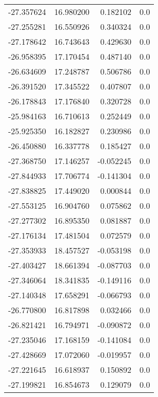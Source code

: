 \begin{tabular}{rrrr}
      -27.357624 &        16.980200 &    0.182102 &   0.0 \\
      -27.255281 &        16.550926 &    0.340324 &   0.0 \\
      -27.178642 &        16.743643 &    0.429630 &   0.0 \\
      -26.958395 &        17.170454 &    0.487140 &   0.0 \\
      -26.634609 &        17.248787 &    0.506786 &   0.0 \\
      -26.391520 &        17.345522 &    0.407807 &   0.0 \\
      -26.178843 &        17.176840 &    0.320728 &   0.0 \\
      -25.984163 &        16.710613 &    0.252449 &   0.0 \\
      -25.925350 &        16.182827 &    0.230986 &   0.0 \\
      -26.450880 &        16.337778 &    0.185427 &   0.0 \\
      -27.368750 &        17.146257 &   -0.052245 &   0.0 \\
      -27.844933 &        17.706774 &   -0.141304 &   0.0 \\
      -27.838825 &        17.449020 &    0.000844 &   0.0 \\
      -27.553125 &        16.904760 &    0.075862 &   0.0 \\
      -27.277302 &        16.895350 &    0.081887 &   0.0 \\
      -27.176134 &        17.481504 &    0.072579 &   0.0 \\
      -27.353933 &        18.457527 &   -0.053198 &   0.0 \\
      -27.403427 &        18.661394 &   -0.087703 &   0.0 \\
      -27.346064 &        18.341835 &   -0.149116 &   0.0 \\
      -27.140348 &        17.658291 &   -0.066793 &   0.0 \\
      -26.770800 &        16.817898 &    0.032466 &   0.0 \\
      -26.821421 &        16.794971 &   -0.090872 &   0.0 \\
      -27.235046 &        17.168159 &   -0.141084 &   0.0 \\
      -27.428669 &        17.072060 &   -0.019957 &   0.0 \\
      -27.221645 &        16.618937 &    0.150892 &   0.0 \\
      -27.199821 &        16.854673 &    0.129079 &   0.0 \\

\end{tabular}
